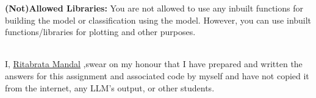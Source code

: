 \documentclass[solution,addpoints,12pt]{exam}
\begin{document}
\begin{questions}
\textbf{(Not)Allowed Libraries:}
You are not allowed to use any inbuilt functions for building the model or classification using the model. However, you can use inbuilt functions/libraries for plotting and other purposes.


\question
{}\\
I, \underline{Ritabrata Mandal} ,swear on my honour that I have prepared and written the answers for this assignment and associated code by myself and have not copied it from the internet, any LLM's output, or other students.
\end{questions}
\end{document}

